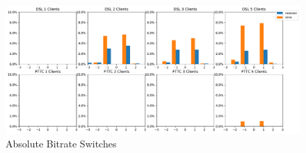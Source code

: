 \documentclass[10pt,sigconf]{acmart}
\begin{document}
\begin{figure}
  \centering
  \includegraphics[width=\textwidth, keepaspectratio]{figures/bitrate_derivative_distribution.pdf}
  \caption{Absolute Bitrate Switches}
  \label{fig:bitrate-switches}
\end{figure}






\end{document}
